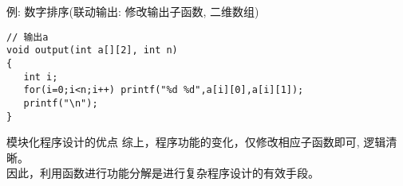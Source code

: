 \begin{frame}{例: 数字排序(联动输出: 修改输出子函数, 二维数组)}
\begin{lstlisting}
// 输出a
void output(int a[][2], int n)
{
   int i;
   for(i=0;i<n;i++) printf("%d %d",a[i][0],a[i][1]);
   printf("\n");
}
\end{lstlisting}

\begin{block}{模块化程序设计的优点}
	综上，程序功能的变化，仅修改相应子函数即可, 逻辑清晰。\\
	因此，利用函数进行功能分解是进行复杂程序设计的有效手段。
\end{block}
\end{frame}






